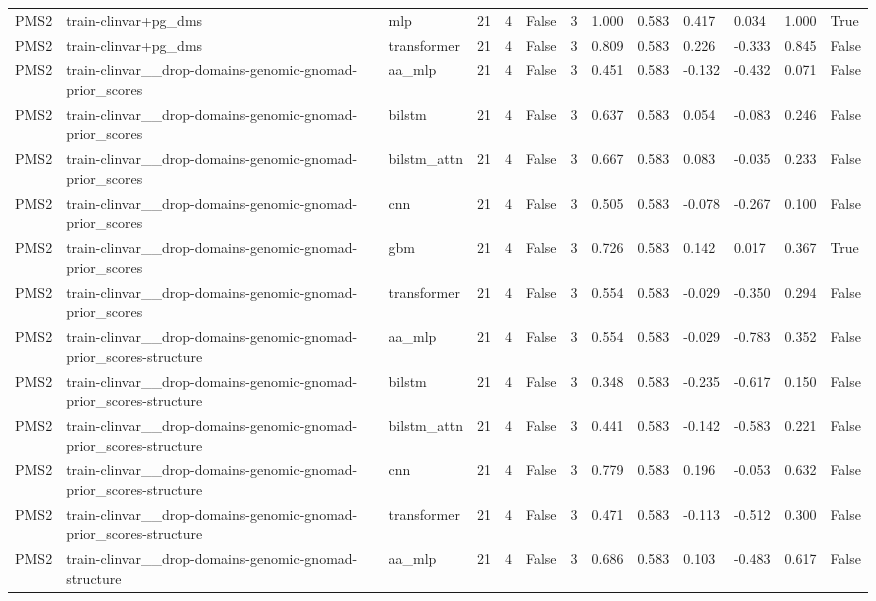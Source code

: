 \begin{table}[t]
\begin{tabular}{lllllllllllll}
PMS2 & train-clinvar+pg\_dms & mlp & 21 & 4 & False & 3 & 1.000 & 0.583 & 0.417 & 0.034 & 1.000 & True \\
PMS2 & train-clinvar+pg\_dms & transformer & 21 & 4 & False & 3 & 0.809 & 0.583 & 0.226 & -0.333 & 0.845 & False \\
PMS2 & train-clinvar\_\_drop-domains-genomic-gnomad-prior\_scores & aa\_mlp & 21 & 4 & False & 3 & 0.451 & 0.583 & -0.132 & -0.432 & 0.071 & False \\
PMS2 & train-clinvar\_\_drop-domains-genomic-gnomad-prior\_scores & bilstm & 21 & 4 & False & 3 & 0.637 & 0.583 & 0.054 & -0.083 & 0.246 & False \\
PMS2 & train-clinvar\_\_drop-domains-genomic-gnomad-prior\_scores & bilstm\_attn & 21 & 4 & False & 3 & 0.667 & 0.583 & 0.083 & -0.035 & 0.233 & False \\
PMS2 & train-clinvar\_\_drop-domains-genomic-gnomad-prior\_scores & cnn & 21 & 4 & False & 3 & 0.505 & 0.583 & -0.078 & -0.267 & 0.100 & False \\
PMS2 & train-clinvar\_\_drop-domains-genomic-gnomad-prior\_scores & gbm & 21 & 4 & False & 3 & 0.726 & 0.583 & 0.142 & 0.017 & 0.367 & True \\
PMS2 & train-clinvar\_\_drop-domains-genomic-gnomad-prior\_scores & transformer & 21 & 4 & False & 3 & 0.554 & 0.583 & -0.029 & -0.350 & 0.294 & False \\
PMS2 & train-clinvar\_\_drop-domains-genomic-gnomad-prior\_scores-structure & aa\_mlp & 21 & 4 & False & 3 & 0.554 & 0.583 & -0.029 & -0.783 & 0.352 & False \\
PMS2 & train-clinvar\_\_drop-domains-genomic-gnomad-prior\_scores-structure & bilstm & 21 & 4 & False & 3 & 0.348 & 0.583 & -0.235 & -0.617 & 0.150 & False \\
PMS2 & train-clinvar\_\_drop-domains-genomic-gnomad-prior\_scores-structure & bilstm\_attn & 21 & 4 & False & 3 & 0.441 & 0.583 & -0.142 & -0.583 & 0.221 & False \\
PMS2 & train-clinvar\_\_drop-domains-genomic-gnomad-prior\_scores-structure & cnn & 21 & 4 & False & 3 & 0.779 & 0.583 & 0.196 & -0.053 & 0.632 & False \\
PMS2 & train-clinvar\_\_drop-domains-genomic-gnomad-prior\_scores-structure & transformer & 21 & 4 & False & 3 & 0.471 & 0.583 & -0.113 & -0.512 & 0.300 & False \\
PMS2 & train-clinvar\_\_drop-domains-genomic-gnomad-structure & aa\_mlp & 21 & 4 & False & 3 & 0.686 & 0.583 & 0.103 & -0.483 & 0.617 & False \\

\end{tabular}
\end{table}

